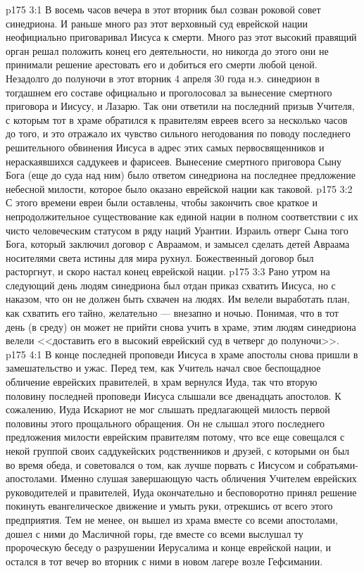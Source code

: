 \vs p175 3:1 В восемь часов вечера в этот вторник был созван роковой совет синедриона. И раньше много раз этот верховный суд еврейской нации неофициально приговаривал Иисуса к смерти. Много раз этот высокий правящий орган решал положить конец его деятельности, но никогда до этого они не принимали решение арестовать его и добиться его смерти любой ценой. Незадолго до полуночи в этот вторник 4 апреля 30 года н.э. синедрион в тогдашнем его составе официально и  проголосовал за вынесение смертного приговора и Иисусу, и Лазарю. Так они ответили на последний призыв Учителя, с которым тот в храме обратился к правителям евреев всего за несколько часов до того, и это отражало их чувство сильного негодования по поводу последнего решительного обвинения Иисуса в адрес этих самых первосвященников и нераскаявшихся саддукеев и фарисеев. Вынесение смертного приговора Сыну Бога (еще до суда над ним) было ответом синедриона на последнее предложение небесной милости, которое было оказано еврейской нации как таковой.
\vs p175 3:2 С этого времени евреи были оставлены, чтобы закончить свое краткое и непродолжительное существование как единой нации в полном соответствии с их чисто человеческим статусом в ряду наций Урантии. Израиль отверг Сына того Бога, который заключил договор с Авраамом, и замысел сделать детей Авраама носителями света истины для мира рухнул. Божественный договор был расторгнут, и скоро настал конец еврейской нации.
\vs p175 3:3 Рано утром на следующий день людям синедриона был отдан приказ схватить Иисуса, но с наказом, что он не должен быть схвачен на людях. Им велели выработать план, как схватить его тайно, желательно --- внезапно и ночью. Понимая, что в тот день (в среду) он может не прийти снова учить в храме, этим людям синедриона велели <<доставить его в высокий еврейский суд в четверг до полуночи>>.
\vs p175 4:1 В конце последней проповеди Иисуса в храме апостолы снова пришли в замешательство и ужас. Перед тем, как Учитель начал свое беспощадное обличение еврейских правителей, в храм вернулся Иуда, так что вторую половину последней проповеди Иисуса слышали все двенадцать апостолов. К сожалению, Иуда Искариот не мог слышать предлагающей милость первой половины этого прощального обращения. Он не слышал этого последнего предложения милости еврейским правителям потому, что все еще совещался с некой группой своих саддукейских родственников и друзей, с которыми он был во время обеда, и советовался о том, как лучше порвать с Иисусом и собратьями\hyp{}апостолами. Именно слушая завершающую часть обличения Учителем еврейских руководителей и правителей, Иуда окончательно и бесповоротно принял решение покинуть евангелическое движение и умыть руки, отрекшись от всего этого предприятия. Тем не менее, он вышел из храма вместе со всеми апостолами, дошел с ними до Масличной горы, где вместе со всеми выслушал ту пророческую беседу о разрушении Иерусалима и конце еврейской нации, и остался в тот вечер во вторник с ними в новом лагере возле Гефсимании.
